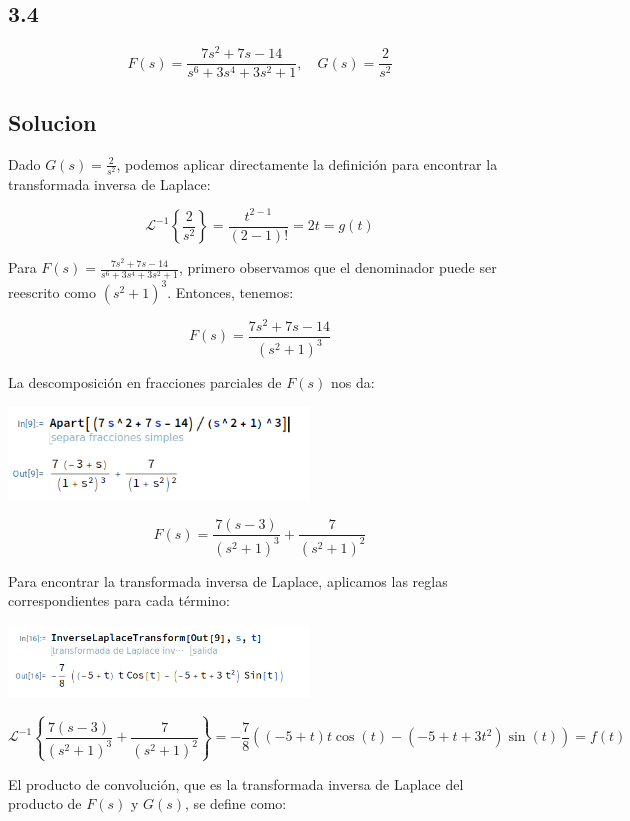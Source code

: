 \documentclass{article}
\begin{document}
\subsection{3.4}
\[
    F(s) = \frac{7s^2+7s-14}{s^6+3s^4+3s^2+1}, \quad G(s) = \frac{2}{s^2}
\]

\subsection*{Solucion}

Dado $G(s) = \frac{2}{s^2}$, podemos aplicar directamente la definición para encontrar la transformada inversa de Laplace:

\[
    \mathcal{L}^{-1}\left\{\frac{2}{s^2}\right\} = \frac{t^{2-1}}{(2-1)!} = 2t = g(t)
\]

Para $F(s) = \frac{7s^2+7s-14}{s^6+3s^4+3s^2+1}$, primero observamos que el denominador puede ser reescrito como $(s^2 + 1)^3$. Entonces, tenemos:

\[
    F(s) = \frac{7s^2 + 7s -14}{(s^2 + 1)^3}
\]

La descomposición en fracciones parciales de $F(s)$ nos da:

\begin{center}
    \includegraphics[width=0.6\textwidth]{./image.png}
\end{center}

\[F(s) = \frac{7(s-3)}{(s^2 + 1)^3} + \frac{7}{(s^2 + 1)^2}\]

Para encontrar la transformada inversa de Laplace, aplicamos las reglas correspondientes para cada término:

\begin{center}
    \includegraphics[width=0.6\textwidth]{./image2.png}
\end{center}

\[
    \mathcal{L}^{-1}\left\{\frac{7(s-3)}{(s^2 + 1)^3} + \frac{7}{(s^2 + 1)^2}\right\} = -\frac{7}{8} \left((-5 + t) t\cos(t) - (-5+t+3t^2)\sin(t)\right) = f(t)
\]

El producto de convolución, que es la transformada inversa de Laplace del producto de $F(s)$ y $G(s)$, se define como:
\end{document}

